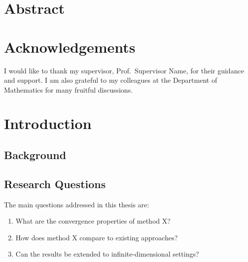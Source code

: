 \documentclass[12pt, a4paper, oneside]{book}
\theoremstyle{plain}
\theoremstyle{definition}
\begin{document}
\chapter*{Abstract}

\lipsum[1]   %

\chapter*{Acknowledgements}

I would like to thank my supervisor, Prof.\ Supervisor Name, for their
guidance and support.  I am also grateful to my colleagues at the Department
of Mathematics for many fruitful discussions.

\lipsum[2]   %

\tableofcontents
\listoffigures
\listoftables

\mainmatter    %

%   
%   

\chapter{Introduction}
\label{ch:introduction}


\section{Background}
\label{sec:background}
\lipsum[3-4]

\section{Research Questions}
\label{sec:research_questions}
The main questions addressed in this thesis are:
\begin{enumerate}
    \item What are the convergence properties of method X?
    \item How does method X compare to existing approaches?
    \item Can the results be extended to infinite-dimensional settings?
\end{enumerate}
\end{document}
